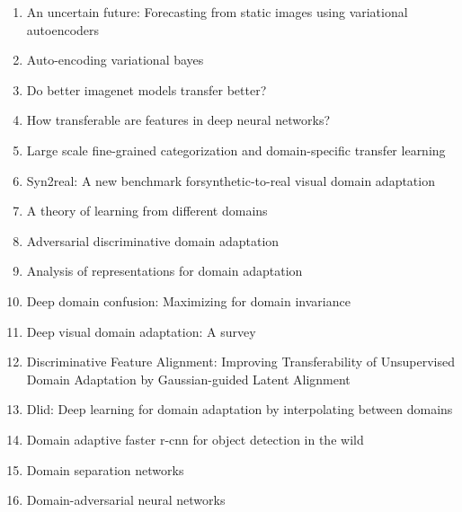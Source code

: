\documentclass[acmlarge]{acmart}
\begin{document}
\begin{enumerate}
	\item An uncertain future: Forecasting from static images using variational autoencoders \cite{walker2016uncertain} 

	\item Auto-encoding variational bayes \cite{kingma2013auto} 

	\item Do better imagenet models transfer better? \cite{kornblith2019better} 

	\item How transferable are features in deep neural networks? \cite{yosinski2014transferable} 

	\item Large scale fine-grained categorization and domain-specific transfer learning \cite{cui2018large} 

	\item Syn2real: A new benchmark forsynthetic-to-real visual domain adaptation \cite{peng2018syn2real} 

	\item A theory of learning from different domains \cite{ben2010theory} 

	\item Adversarial discriminative domain adaptation \cite{tzeng2017adversarial} 

	\item Analysis of representations for domain adaptation \cite{ben2007analysis} 

	\item Deep domain confusion: Maximizing for domain invariance \cite{tzeng2014deep} 

	\item Deep visual domain adaptation: A survey \cite{wang2018deep} 

	\item Discriminative Feature Alignment: Improving Transferability of Unsupervised Domain Adaptation by Gaussian-guided Latent Alignment \cite{wang2020discriminative} 

	\item Dlid: Deep learning for domain adaptation by interpolating between domains \cite{chopra2013dlid} 

	\item Domain adaptive faster r-cnn for object detection in the wild \cite{chen2018domain} 

	\item Domain separation networks \cite{bousmalis2016domain} 

	\item Domain-adversarial neural networks \cite{ajakan2014domain} 


\end{enumerate}
\end{document}
